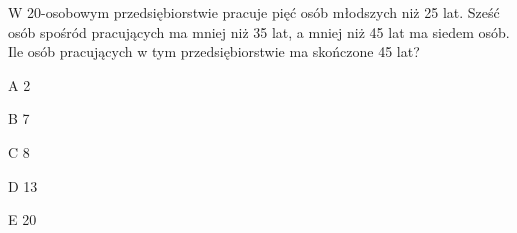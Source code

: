 \begin{tresc}
W 20-osobowym przedsiębiorstwie pracuje pięć osób młodszych niż 25 lat. Sześć osób spośród pracujących ma mniej niż 35 lat, a mniej niż 45 lat ma siedem osób. Ile osób pracujących w tym przedsiębiorstwie ma skończone 45 lat?
\end{tresc}
\begin{wariant}{A} 2 \end{wariant}
\begin{wariant}{B} 7 \end{wariant}
\begin{wariant}{C} 8 \end{wariant}
\begin{wariant}{D} 13 \end{wariant}
\begin{wariant}{E} 20 \end{wariant}
